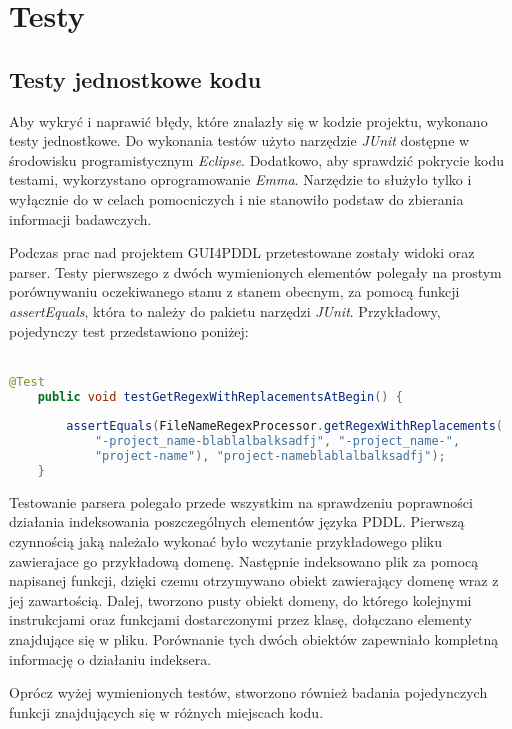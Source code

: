 \chapter{Testy}
\section{Testy jednostkowe kodu}
Aby wykryć i naprawić błędy, które znalazły się w kodzie projektu, wykonano testy jednostkowe. Do wykonania testów użyto narzędzie \textit{JUnit }dostępne w środowisku programistycznym \textit{Eclipse}. Dodatkowo, aby sprawdzić pokrycie kodu testami, wykorzystano oprogramowanie \textit{Emma}. Narzędzie to służyło tylko i wyłącznie do w celach pomocniczych i nie stanowiło podstaw do zbierania informacji badawczych.

Podczas prac nad projektem GUI4PDDL przetestowane zostały widoki oraz parser. Testy pierwszego z dwóch wymienionych elementów polegały na prostym porównywaniu oczekiwanego stanu z stanem obecnym, za pomocą funkcji \textit{assertEquals}, która to należy do pakietu narzędzi \textit{JUnit}. Przykładowy, pojedynczy test przedstawiono poniżej:\\\\
\begin{Code}
\begin{lstlisting}[language=JAVA,frame=single,label=ana_code, caption=Przykładowy test jedostkowy]
	@Test
	public void testGetRegexWithReplacementsAtBegin() {
		
		assertEquals(FileNameRegexProcessor.getRegexWithReplacements(
			"-project_name-blablalbalksadfj", "-project_name-", 
			"project-name"), "project-nameblablalbalksadfj");
	}
\end{lstlisting}
\end{Code}

Testowanie parsera polegało przede wszystkim na sprawdzeniu poprawności działania indeksowania poszczególnych elementów języka PDDL. Pierwszą czynnością jaką należało wykonać było wczytanie przykładowego pliku zawierajace go przykładową domenę. Następnie indeksowano plik za pomocą napisanej funkcji, dzięki czemu otrzymywano obiekt zawierający domenę wraz z jej zawartością. Dalej, tworzono pusty obiekt domeny, do którego kolejnymi instrukcjami oraz funkcjami dostarczonymi przez klasę, dołączano elementy znajdujące się w pliku. Porównanie tych dwóch obiektów zapewniało kompletną informację o działaniu indeksera.

Oprócz wyżej wymienionych testów, stworzono również badania pojedynczych funkcji znajdujących się w różnych miejscach kodu.

